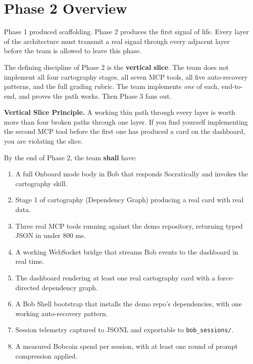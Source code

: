 \documentclass[11pt,letterpaper]{article}
\newcommand{\shall}{\textbf{shall}}
\begin{document}
{\hypersetup{linkcolor=ibmdark}\tableofcontents}
\newpage

\section{Phase 2 Overview}

Phase 1 produced scaffolding. Phase 2 produces the first signal of life. Every layer of the architecture must transmit a real signal through every adjacent layer before the team is allowed to leave this phase.

The defining discipline of Phase 2 is the \textbf{vertical slice}. The team does not implement all four cartography stages, all seven MCP tools, all five auto-recovery patterns, and the full grading rubric. The team implements \textit{one} of each, end-to-end, and proves the path works. Then Phase 3 fans out.

\begin{principle}
\textbf{Vertical Slice Principle.} A working thin path through every layer is worth more than four broken paths through one layer. If you find yourself implementing the second MCP tool before the first one has produced a card on the dashboard, you are violating the slice.
\end{principle}

By the end of Phase 2, the team \shall{} have:

\begin{enumerate}
  \item A full Onboard mode body in Bob that responds Socratically and invokes the cartography skill.
  \item Stage 1 of cartography (Dependency Graph) producing a real card with real data.
  \item Three real MCP tools running against the demo repository, returning typed JSON in under 800 ms.
  \item A working WebSocket bridge that streams Bob events to the dashboard in real time.
  \item The dashboard rendering at least one real cartography card with a force-directed dependency graph.
  \item A Bob Shell bootstrap that installs the demo repo's dependencies, with one working auto-recovery pattern.
  \item Session telemetry captured to JSONL and exportable to \texttt{bob\_sessions/}.
  \item A measured Bobcoin spend per session, with at least one round of prompt compression applied.
\end{enumerate}
\end{document}
